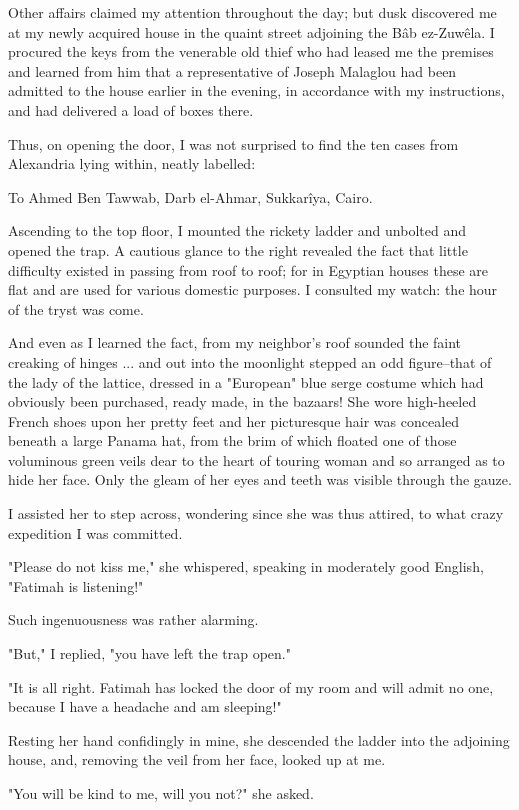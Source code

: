 Other affairs claimed my attention throughout the day; but dusk
discovered me at my newly acquired house in the quaint street
adjoining the Bâb ez-Zuwêla. I procured the keys from the venerable
old thief who had leased me the premises and learned from him that a
representative of Joseph Malaglou had been admitted to the house
earlier in the evening, in accordance with my instructions, and had
delivered a load of boxes there.

Thus, on opening the door, I was not surprised to find the ten cases
from Alexandria lying within, neatly labelled:

  To Ahmed Ben Tawwab,
    Darb el-Ahmar,
      Sukkarîya,
        Cairo.

Ascending to the top floor, I mounted the rickety ladder and unbolted
and opened the trap. A cautious glance to the right revealed the fact
that little difficulty existed in passing from roof to roof; for in
Egyptian houses these are flat and are used for various domestic
purposes. I consulted my watch: the hour of the tryst was come.

And even as I learned the fact, from my neighbor's roof sounded the
faint creaking of hinges ... and out into the moonlight stepped an odd
figure--that of the lady of the lattice, dressed in a "European" blue
serge costume which had obviously been purchased, ready made, in the
bazaars! She wore high-heeled French shoes upon her pretty feet and
her picturesque hair was concealed beneath a large Panama hat, from
the brim of which floated one of those voluminous green veils dear to
the heart of touring woman and so arranged as to hide her face. Only
the gleam of her eyes and teeth was visible through the gauze.

I assisted her to step across, wondering since she was thus attired,
to what crazy expedition I was committed.

"Please do not kiss me," she whispered, speaking in moderately good
English, "Fatimah is listening!"

Such ingenuousness was rather alarming.

"But," I replied, "you have left the trap open."

"It is all right. Fatimah has locked the door of my room and will
admit no one, because I have a headache and am sleeping!"

Resting her hand confidingly in mine, she descended the ladder into
the adjoining house, and, removing the veil from her face, looked up
at me.

"You will be kind to me, will you not?" she asked.

